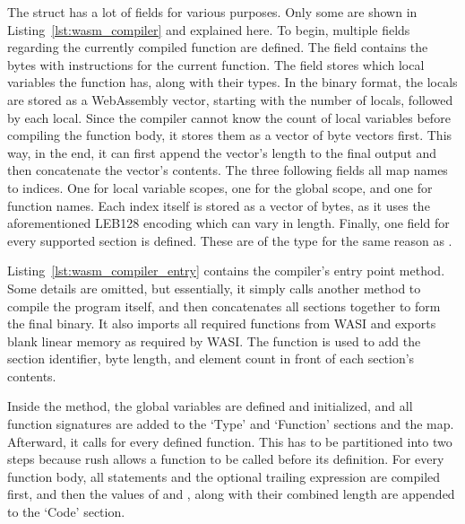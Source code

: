 The  struct has a lot of fields for various purposes.
Only some are shown in Listing~\ref{lst:wasm_compiler} and explained here.
To begin, multiple fields regarding the currently compiled function are defined.
The field  contains the bytes with instructions for the current function.
The field  stores which local variables the function has, along with their types.
In the binary format, the locals are stored as a WebAssembly vector, starting with the number of locals, followed by each local.
Since the compiler cannot know the count of local variables before compiling the function body, it stores them as a vector of byte vectors first.
This way, in the end, it can first append the vector's length to the final output and then concatenate the vector's contents.
The three following fields all map names to indices.
One for local variable scopes, one for the global scope, and one for function names.
Each index itself is stored as a vector of bytes, as it uses the aforementioned LEB128 encoding which can vary in length.
Finally, one field for every supported section is defined.
These are of the type  for the same reason as .


Listing~\ref{lst:wasm_compiler_entry} contains the compiler's entry point method.
Some details are omitted, but essentially, it simply calls another method to compile the program itself, and then concatenates all sections together to form the final binary.
It also imports all required functions from WASI and exports blank linear memory as required by WASI\@.
The  function is used to add the section identifier, byte length, and element count in front of each section's contents.


Inside the  method, the global variables are defined and initialized, and all function signatures are added to the `Type' and `Function' sections and the  map.
Afterward, it calls  for every defined function.
This has to be partitioned into two steps because rush allows a function to be called before its definition.
For every function body, all statements and the optional trailing expression are compiled first, and then the values of  and , along with their combined length are appended to the `Code' section.

